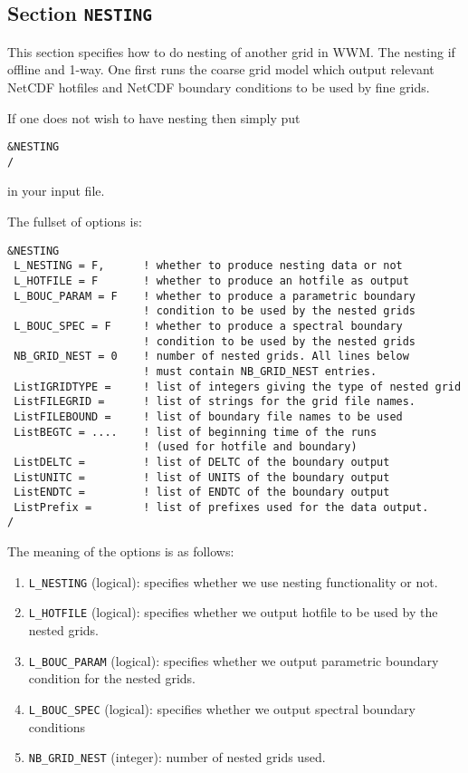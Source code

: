 \documentclass[12pt]{amsart}
\begin{document}
\newpage

\subsection{Section {\tt NESTING}}
This section specifies how to do nesting of another grid in WWM. The nesting if offline and 1-way.
One first runs the coarse grid model which output relevant NetCDF hotfiles and NetCDF boundary conditions to be
used by fine grids.

If one does not wish to have nesting then simply put
\begin{verbatim}
&NESTING
/
\end{verbatim}
in your input file.

The fullset of options is:
\begin{verbatim}
&NESTING
 L_NESTING = F,      ! whether to produce nesting data or not
 L_HOTFILE = F       ! whether to produce an hotfile as output
 L_BOUC_PARAM = F    ! whether to produce a parametric boundary
                     ! condition to be used by the nested grids
 L_BOUC_SPEC = F     ! whether to produce a spectral boundary
                     ! condition to be used by the nested grids
 NB_GRID_NEST = 0    ! number of nested grids. All lines below
                     ! must contain NB_GRID_NEST entries.
 ListIGRIDTYPE =     ! list of integers giving the type of nested grid
 ListFILEGRID =      ! list of strings for the grid file names.
 ListFILEBOUND =     ! list of boundary file names to be used
 ListBEGTC = ....    ! list of beginning time of the runs
                     ! (used for hotfile and boundary)
 ListDELTC =         ! list of DELTC of the boundary output
 ListUNITC =         ! list of UNITS of the boundary output
 ListENDTC =         ! list of ENDTC of the boundary output
 ListPrefix =        ! list of prefixes used for the data output.
/
\end{verbatim}
The meaning of the options is as follows:
\begin{enumerate}
\item {\tt L\_NESTING} (logical): specifies whether we use nesting functionality or not.
\item {\tt L\_HOTFILE} (logical): specifies whether we output hotfile to be used by the nested grids.
\item {\tt L\_BOUC\_PARAM} (logical): specifies whether we output parametric boundary condition for the nested grids.
\item {\tt L\_BOUC\_SPEC} (logical): specifies whether we output spectral boundary conditions
\item {\tt NB\_GRID\_NEST} (integer): number of nested grids used.
\end{enumerate}
\end{document}
